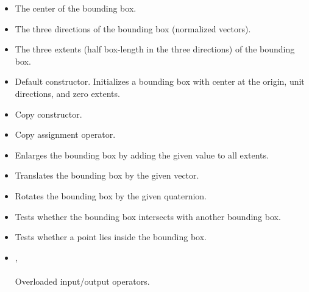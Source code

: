\documentclass[a4paper,onecolumn,11pt]{doofus}
\begin{document}
\begin{itemize}
\item {} The center of the bounding box.
\item {} The three directions of the bounding box (normalized vectors).
\item {} The three extents (half box-length in the three directions) of the bounding box.
\item {} Default constructor. Initializes a bounding box with center at the origin, unit directions, and zero extents.
\item {} Copy constructor.
\item {} Copy assignment operator.
\item {} Enlarges the bounding box by adding the given value to all extents.
\item {} Translates the bounding box by the given vector.
\item {} Rotates the bounding box by the given quaternion.
\item {} Tests whether the bounding box intersects with another bounding box.
\item {} Tests whether a point lies inside the bounding box.
\item {},\\ \\ Overloaded input/output operators.
\end{itemize}
\end{document}
